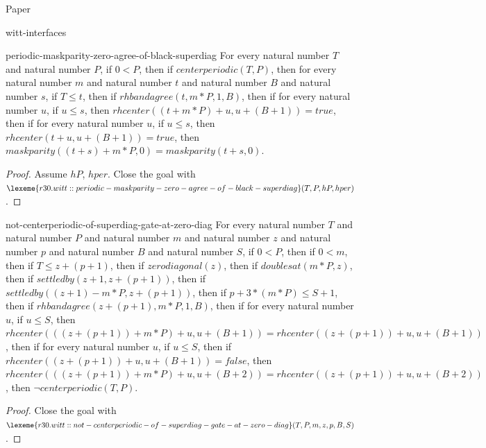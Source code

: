 \begin{lexlean}{Paper}
\begin{section}{witt-interfaces}
  \begin{theorem}{periodic-maskparity-zero-agree-of-black-superdiag}
  For every natural number \(T\) and natural number \(P\), if \(0 < P\), then if \(centerperiodic(T, P)\), then for every natural number \(m\) and natural number \(t\) and natural number \(B\) and natural number \(s\), if \(T ≤ t\), then if \(rhbandagree(t, m * P, 1, B)\), then if for every natural number \(u\), if \(u ≤ s\), then \(rhcenter((t + m * P) + u, u + (B + 1)) = true\), then if for every natural number \(u\), if \(u ≤ s\), then \(rhcenter(t + u, u + (B + 1)) = true\), then \(maskparity((t + s) + m * P, 0) = maskparity(t + s, 0)\).
  \begin{proof}
  Assume \(hP\), \(hper\).
  Close the goal with \(\lexeme{r30.witt::periodic-maskparity-zero-agree-of-black-superdiag}(T, P, hP, hper)\).
  \end{proof}
  \end{theorem}

  \begin{theorem}{not-centerperiodic-of-superdiag-gate-at-zero-diag}
  For every natural number \(T\) and natural number \(P\) and natural number \(m\) and natural number \(z\) and natural number \(p\) and natural number \(B\) and natural number \(S\), if \(0 < P\), then if \(0 < m\), then if \(T ≤ z + (p + 1)\), then if \(zerodiagonal(z)\), then if \(doublesat(m * P, z)\), then if \(settledby(z + 1, z + (p + 1))\), then if \(settledby((z + 1) - m * P, z + (p + 1))\), then if \(p + 3 * (m * P) ≤ S + 1\), then if \(rhbandagree(z + (p + 1), m * P, 1, B)\), then if for every natural number \(u\), if \(u ≤ S\), then \(rhcenter(((z + (p + 1)) + m * P) + u, u + (B + 1)) = rhcenter((z + (p + 1)) + u, u + (B + 1))\), then if for every natural number \(u\), if \(u ≤ S\), then if \(rhcenter((z + (p + 1)) + u, u + (B + 1)) = false\), then \(rhcenter(((z + (p + 1)) + m * P) + u, u + (B + 2)) = rhcenter((z + (p + 1)) + u, u + (B + 2))\), then \(¬ centerperiodic(T, P)\).
  \begin{proof}
  Close the goal with \(\lexeme{r30.witt::not-centerperiodic-of-superdiag-gate-at-zero-diag}(T, P, m, z, p, B, S)\).
  \end{proof}
  \end{theorem}


\end{section}
\end{lexlean}
